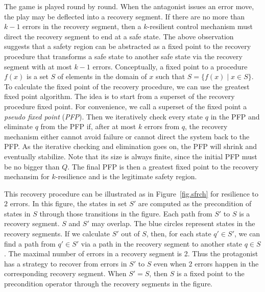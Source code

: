 The game is played round by round. 
When the antagonist issues an error move, 
the play may be deflected into a recovery segment.  
If there are no more than $k-1$ errors in the recovery segment, 
then a $k$-resilient control mechanism must direct the recovery segment
to end at a safe state. 
The above observation suggests that 
a safety region can be abstracted as a fixed point 
to the recovery procedure 
that transforms a safe state to another safe state via the recovery segment 
with at most $k-1$ errors. 
\label{reply1.fixed.point.explanation} 
Conceptually, a fixed point to a procedure $f(x)$ is a set $S$ of elements 
in the domain of $x$ such that $S=\{f(x)\mid x\in S\}$.  
To calculate the fixed point of the recovery procedure, 
we can use the greatest fixed point algorithm.  
The idea is to start from a superset of the recovery procedure fixed point. 
For convenience, we call a superset of the fixed point a {\em pseudo fixed point} 
({\em PFP}).  
Then we iteratively check every state $q$ in the PFP and eliminate 
$q$ from the PFP if, after at most $k$ errors from $q$, 
the recovery mechanism either cannot avoid failure or 
cannot direct the system back to the PFP. 
As the iterative checking and elimination goes on, 
the PFP will shrink and eventually stabilize.
Note that its size is always finite, 
since the initial PFP must be no bigger than $Q$.  
The final PFP is then a greatest fixed point to the recovery mechansim for 
$k$-resilience and is the legitimate safety region.  
 

This recovery procedure can be illustrated as in Figure~\ref{fig.sfrch} 
for resilience to $2$ errors.  
In this figure, the states in set $S'$ are computed  
as the precondition of states in $S$ through those transitions in the figure.  
Each path from $S'$ to $S$ is a recovery segment. 
$S$ and $S'$ may overlap.  
The blue circles represent states in the recovery segments.  
If we calculate $S'$ out of $S$, 
then, for each state $q'\in S'$, we can find a path from 
$q'\in S'$ via a path in the recovery segment to another state $q\in S$.  
The maximal number of errors in a recovery segment is 2.  
Thus the protagonist has a strategy to recover from errors in $S'$ to $S$ 
even when 2 errors happen in the corresponding recovery segment.  
When $S'=S$, then $S$ is a fixed point to the precondition 
operator through the recovery segments in the figure.  

